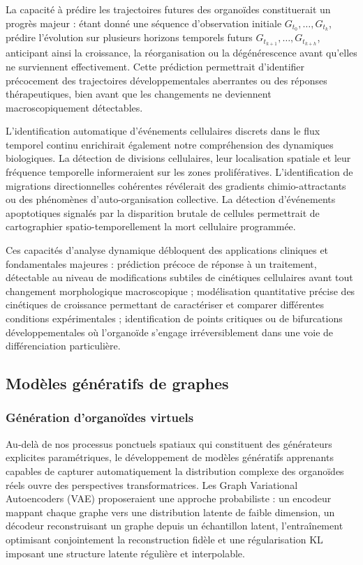 La capacité à prédire les trajectoires futures des organoïdes constituerait un progrès majeur : étant donné une séquence d'observation initiale $G_{t_0}, \ldots, G_{t_k}$, prédire l'évolution sur plusieurs horizons temporels futurs $G_{t_{k+1}}, \ldots, G_{t_{k+h}}$, anticipant ainsi la croissance, la réorganisation ou la dégénérescence avant qu'elles ne surviennent effectivement. Cette prédiction permettrait d'identifier précocement des trajectoires développementales aberrantes ou des réponses thérapeutiques, bien avant que les changements ne deviennent macroscopiquement détectables.

L'identification automatique d'événements cellulaires discrets dans le flux temporel continu enrichirait également notre compréhension des dynamiques biologiques. La détection de divisions cellulaires, leur localisation spatiale et leur fréquence temporelle informeraient sur les zones prolifératives. L'identification de migrations directionnelles cohérentes révélerait des gradients chimio-attractants ou des phénomènes d'auto-organisation collective. La détection d'événements apoptotiques signalés par la disparition brutale de cellules permettrait de cartographier spatio-temporellement la mort cellulaire programmée.

Ces capacités d'analyse dynamique débloquent des applications cliniques et fondamentales majeures : prédiction précoce de réponse à un traitement, détectable au niveau de modifications subtiles de cinétiques cellulaires avant tout changement morphologique macroscopique ; modélisation quantitative précise des cinétiques de croissance permettant de caractériser et comparer différentes conditions expérimentales ; identification de points critiques ou de bifurcations développementales où l'organoïde s'engage irréversiblement dans une voie de différenciation particulière.

\subsection{Modèles génératifs de graphes}

\subsubsection{Génération d'organoïdes virtuels}

Au-delà de nos processus ponctuels spatiaux qui constituent des générateurs explicites paramétriques, le développement de modèles génératifs apprenants capables de capturer automatiquement la distribution complexe des organoïdes réels ouvre des perspectives transformatrices. Les Graph Variational Autoencoders (VAE) proposeraient une approche probabiliste : un encodeur mappant chaque graphe vers une distribution latente de faible dimension, un décodeur reconstruisant un graphe depuis un échantillon latent, l'entraînement optimisant conjointement la reconstruction fidèle et une régularisation KL imposant une structure latente régulière et interpolable.

